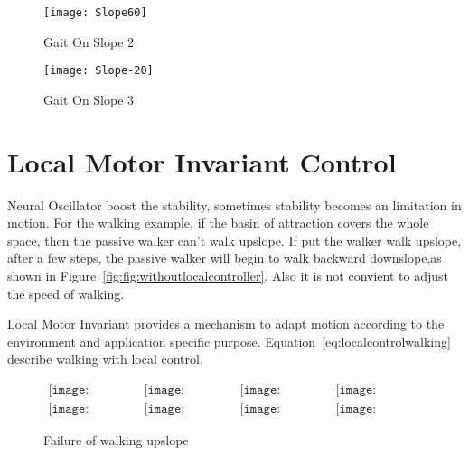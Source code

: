 \begin{figure}[!htbp]
  \begin{center}
      \texttt{[image: Slope60]}
    \caption{Gait On Slope 2}
    \label{fig:ss2}
\end{center}
\end{figure}

\begin{figure}[!htbp]
  \begin{center}
      \texttt{[image: Slope-20]}
    \caption{Gait On Slope 3}
    \label{fig:ss3}
\end{center}
\end{figure}






\section{Local Motor Invariant Control}
Neural Oscillator boost the stability, sometimes stability becomes an limitation in motion.
For the walking example, if the basin of attraction covers the whole space, then the passive walker can't walk upslope.
If put the walker walk upslope, after a few steps, the passive walker will begin to walk backward downslope,as shown in Figure~\ref{fig:fig:withoutlocalcontroller}.
Also it is not convient to adjust the speed of walking.

Local Motor Invariant provides a mechanism to adapt motion according to the environment and application specific purpose.
Equation~\ref{eq:localcontrolwalking} describe walking with local control.


\begin{figure}[!htbp]
  \begin{center}
         $\begin{array}{cccc}
\texttt{[image: UpFall/0001.eps]}&
\texttt{[image: UpFall/0051.eps]}&
\texttt{[image: UpFall/0101.eps]}&
\texttt{[image: UpFall/0151.eps]}
\\
\texttt{[image: UpFall/0201.eps]}&
\texttt{[image: UpFall/0251.eps]}&
\texttt{[image: UpFall/0301.eps]}&
\texttt{[image: UpFall/0351.eps]}
\end{array}$
    \caption{Failure of walking upslope}
    \label{fig:localcontrolwalking}
\end{center}
\end{figure}

